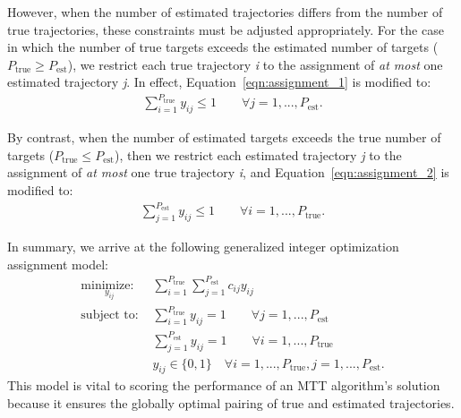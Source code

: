 However, when the number of estimated trajectories differs from the number of true trajectories, these constraints must be adjusted appropriately. For the case in which the number of true targets exceeds the estimated number of targets ($P_{\text{true}}\geq P_{\text{est}}$), we restrict each true trajectory \textit{i} to the assignment of \textit{at most} one estimated trajectory \textit{j}. In effect, Equation~\ref{eqn:assignment_1} is modified to:
\begin{align*}
\sum_{i=1}^{P_{\text{true}}} y_{ij} \leq 1 \qquad \forall  j = 1,...,P_{\text{est}}.
\end{align*}

By contrast, when the number of estimated targets exceeds the true number of targets ($P_{\text{true}}\leq P_{\text{est}}$), then we restrict each estimated trajectory \textit{j} to the assignment of \textit{at most} one true trajectory \textit{i}, and Equation~\ref{eqn:assignment_2} is modified to:
\begin{align*}
\sum_{j=1}^{P_{\text{est}}} y_{ij} \leq 1 \qquad \forall i = 1,...,P_{\text{true}}.
\end{align*}

In summary, we arrive at the following generalized integer optimization assignment model:
\begin{align*}
\underset{y_{ij}}{\text{minimize: }} & \sum_{i=1}^{P_{\text{true}}} \sum_{j=1}^{P_{\text{est}}} c_{ij}y_{ij}\\
\text{subject to: }	& \sum_{i=1}^{P_{\text{true}}} y_{ij} = 1 \qquad \forall j = 1,...,P_{\text{est}} \nonumber \\
				& \sum_{j=1}^{P_{\text{est}}} y_{ij} = 1 \qquad \forall i = 1,...,P_{\text{true}} \nonumber \\
				& y_{ij} \in \{0,1\} \quad \forall i = 1,...,P_{\text{true}},j = 1,...,P_{\text{est}}. \nonumber
\end{align*}
This model is vital to scoring the performance of an MTT algorithm's solution because it ensures the globally optimal pairing of true and estimated trajectories.

